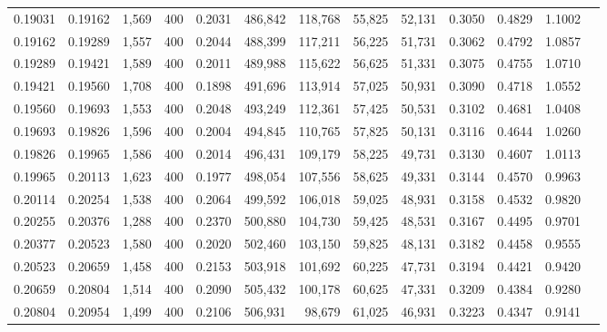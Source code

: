 \begin{tabular}{rrrrrrrrrrrrr}
0.19031 & 0.19162 &  1,569 & 400 &                                     0.2031 & 486,842 & 118,768 &  55,825 &  52,131 & 0.3050 & 0.4829 & 1.1002 \\
0.19162 & 0.19289 &  1,557 & 400 &                                     0.2044 & 488,399 & 117,211 &  56,225 &  51,731 & 0.3062 & 0.4792 & 1.0857 \\
0.19289 & 0.19421 &  1,589 & 400 &                                     0.2011 & 489,988 & 115,622 &  56,625 &  51,331 & 0.3075 & 0.4755 & 1.0710 \\
0.19421 & 0.19560 &  1,708 & 400 &                                     0.1898 & 491,696 & 113,914 &  57,025 &  50,931 & 0.3090 & 0.4718 & 1.0552 \\
0.19560 & 0.19693 &  1,553 & 400 &                                     0.2048 & 493,249 & 112,361 &  57,425 &  50,531 & 0.3102 & 0.4681 & 1.0408 \\
0.19693 & 0.19826 &  1,596 & 400 &                                     0.2004 & 494,845 & 110,765 &  57,825 &  50,131 & 0.3116 & 0.4644 & 1.0260 \\
0.19826 & 0.19965 &  1,586 & 400 &                                     0.2014 & 496,431 & 109,179 &  58,225 &  49,731 & 0.3130 & 0.4607 & 1.0113 \\
0.19965 & 0.20113 &  1,623 & 400 &                                     0.1977 & 498,054 & 107,556 &  58,625 &  49,331 & 0.3144 & 0.4570 & 0.9963 \\
0.20114 & 0.20254 &  1,538 & 400 &                                     0.2064 & 499,592 & 106,018 &  59,025 &  48,931 & 0.3158 & 0.4532 & 0.9820 \\
0.20255 & 0.20376 &  1,288 & 400 &                                     0.2370 & 500,880 & 104,730 &  59,425 &  48,531 & 0.3167 & 0.4495 & 0.9701 \\
0.20377 & 0.20523 &  1,580 & 400 &                                     0.2020 & 502,460 & 103,150 &  59,825 &  48,131 & 0.3182 & 0.4458 & 0.9555 \\
0.20523 & 0.20659 &  1,458 & 400 &                                     0.2153 & 503,918 & 101,692 &  60,225 &  47,731 & 0.3194 & 0.4421 & 0.9420 \\
0.20659 & 0.20804 &  1,514 & 400 &                                     0.2090 & 505,432 & 100,178 &  60,625 &  47,331 & 0.3209 & 0.4384 & 0.9280 \\
0.20804 & 0.20954 &  1,499 & 400 &                                     0.2106 & 506,931 &  98,679 &  61,025 &  46,931 & 0.3223 & 0.4347 & 0.9141 \\

\end{tabular}

